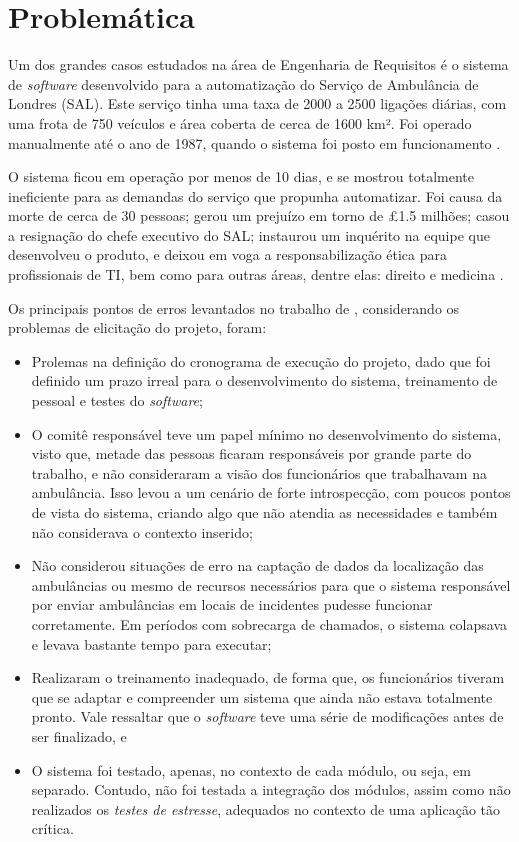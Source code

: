 \section{Problemática}
\label{ref:problematica}
    
Um dos grandes casos estudados na área de Engenharia de Requisitos é o sistema de \textit{software} desenvolvido para a automatização do Serviço de Ambulância de Londres (SAL). Este serviço tinha uma taxa de 2000 a 2500 ligações diárias, com uma frota de 750 veículos e área coberta de cerca de 1600 km². Foi operado manualmente até o ano de 1987, quando o sistema foi posto em funcionamento \cite{LodonFiasco}.

O sistema ficou em operação por menos de 10 dias, e se mostrou totalmente ineficiente para as demandas do serviço que propunha automatizar. Foi causa da morte de cerca de 30 pessoas; gerou um prejuízo em torno de £1.5 milhões; casou a resignação do chefe executivo do SAL; instaurou um inquérito na equipe que desenvolveu o produto, e deixou em voga a responsabilização ética para profissionais de TI, bem como para outras áreas, dentre elas: direito e medicina \cite{LodonFiasco}.

Os principais pontos de erros levantados no trabalho de \cite{LodonFiasco}, considerando os problemas de elicitação do projeto, foram:

\begin{itemize}
    \item Prolemas na definição do cronograma de execução do projeto, dado que foi definido um prazo irreal para o desenvolvimento do sistema, treinamento de pessoal e testes do \textit{software};
    
    \item O comitê responsável teve um papel mínimo no desenvolvimento do sistema, visto que, metade das pessoas ficaram responsáveis por grande parte do trabalho, e não consideraram a visão dos funcionários que trabalhavam na ambulância. Isso levou a um cenário de forte introspecção, com poucos pontos de vista do sistema, criando algo que não atendia as necessidades e também não considerava o contexto inserido;
    
    \item Não considerou situações de erro na captação de dados da localização das ambulâncias ou mesmo de recursos necessários para que o sistema responsável por enviar ambulâncias em locais de incidentes pudesse funcionar corretamente. Em períodos com sobrecarga de chamados, o sistema colapsava e levava bastante tempo para executar;
    
    \item Realizaram o treinamento inadequado, de forma que, os funcionários tiveram que se adaptar e compreender um sistema que ainda não estava totalmente pronto. Vale ressaltar que o \textit{software} teve uma série de modificações antes de ser finalizado, e
    
    \item O sistema foi testado, apenas, no contexto de cada módulo, ou seja, em separado. Contudo, não foi testada a integração dos módulos, assim como não realizados os \textit{testes de estresse}, adequados no contexto de uma aplicação tão crítica.
\end{itemize}


